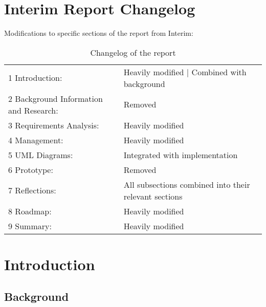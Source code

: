\documentclass[a4paper]{article}
\begin{document}
\tableofcontents
\clearpage

\section{Interim Report Changelog}
Modifications to specific sections of the report from Interim:

\begin{table}[H]
    \centering
    \begin{tabular}{p{7cm}p{8cm}}

        1 Introduction:
        &
        Heavily modified | Combined with background \\

        2 Background Information and Research: 
        &
        Removed \\

        3 Requirements Analysis:
        &
        Heavily modified \\

        4 Management:  
        &
        Heavily modified \\

        5 UML Diagrams:
        &
        Integrated with implementation \\

        6 Prototype:
        &
        Removed \\

        7 Reflections:
        &
        All subsections combined into their relevant sections \\

        8 Roadmap:
        &
        Heavily modified \\

        9 Summary:
        &
        Heavily modified \\

    \end{tabular}
    \caption{Changelog of the report}
    \label{tab:changelog}
\end{table}

\section{Introduction}
\subsection{Background}
\end{document}
